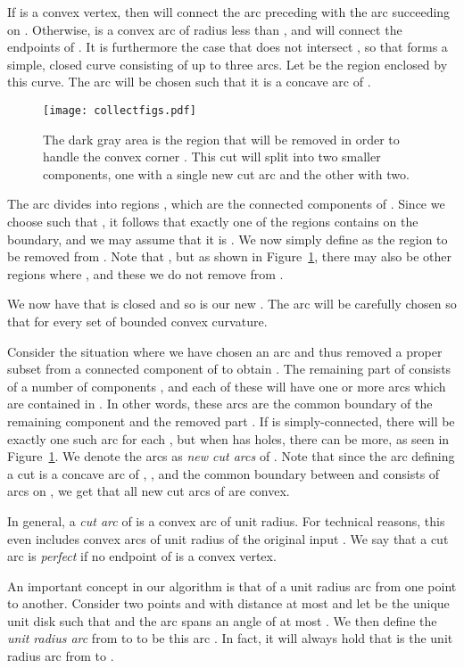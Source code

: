 \documentclass{article}
\begin{document}
If  is a convex vertex, then  will connect the arc preceding  with the arc succeeding  on .
Otherwise,  is a convex arc of radius less than , and  will connect the endpoints of .
It is furthermore the case that  does not intersect , so that  forms a simple, closed curve consisting of up to three arcs.
Let  be the region enclosed by this curve.
The arc  will be chosen such that it is a concave arc of .

\begin{figure}
\centering
\texttt{[image: collectfigs.pdf]}
\caption{
The dark gray area is the region  that will be removed in order to handle the convex corner .
This cut will split  into two smaller components, one with a single new cut arc and the other with two.
}
\label{cutFig}
\end{figure}

The arc  divides  into regions , which are
the connected components of .
Since we choose  such that , it follows that exactly one of the regions contains  on the boundary, and we may assume that it is .
We now simply define  as the region to be removed from .
Note that , but as shown in Figure~\ref{cutFig}, there may also be other regions  where , and these we do not remove from .

We now have that  is closed and so is our new
.
The arc  will be carefully chosen so that
 for every set 
of bounded convex curvature.

Consider the situation where we have chosen an arc  and thus removed a proper subset  from a connected component  of  to obtain .
The remaining part of  consists of a number  of components , and each of these  will have one or more arcs  which are contained in .
In other words, these arcs are the common boundary of the remaining component  and the removed part .
If  is simply-connected, there will be exactly one such arc for each , but when  has holes, there can be more, as seen in Figure~\ref{cutFig}.
We denote the arcs  as \emph{new cut arcs} of .
Note that since the arc  defining a cut is a concave arc of , , and the common boundary between  and  consists of arcs on , we get that all new cut arcs of  are convex.

In general, a \emph{cut arc} of  is a convex arc of unit radius. 
For technical reasons, this even includes convex arcs of unit radius of the original input .
We say that a cut arc  is \emph{perfect} if no endpoint of  is a convex vertex.

An important concept in our algorithm is that of a unit radius arc from one point to another.
Consider two points  and  with distance at most  and let  be the unique unit disk such that  and the arc  spans an angle of at most .
We then define the \emph{unit radius arc} from  to  to be this arc .
In fact, it will always hold that  is the unit radius arc from  to .
\end{document}
